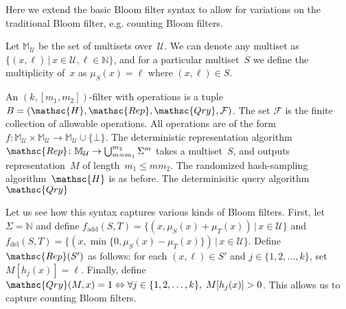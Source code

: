 Here we extend the basic Bloom filter syntax to allow for variations on the traditional Bloom filter, e.g. counting Bloom filters.  

Let $\mathbb{M}_\mathcal{U}$ be the set of multisets over~$\mathcal{U}$.  We can denote any multiset as $\{(x,\ell) \,|\, x \in \mathcal{U}, \ell \in \mathbb{N}\}$, and for a particular multiset~$S$ we define the multiplicity of~$x$ as $\mu_S(x) = \ell$ where $(x,\ell)\in S$.

An $(k,[m_1,m_2])$-filter with operations is a tuple  $B=(\mathsc{H},\mathsc{Rep},\mathsc{Qry}, \mathcal{F})$.  
The set $\mathcal{F}$ is the finite collection of allowable operations.  All operations are of the form 
$f: \mathbb{M}_{\mathcal{U}} \times \mathbb{M}_{\mathcal{U}} \rightarrow \mathbb{M}_{\mathcal{U}} \cup \{\bot\}$.  
%
The deterministic representation algorithm $\mathsc{Rep}\colon \mathbb{M}_\mathcal{U} \rightarrow \bigcup_{m=m_1}^{m_2}\Sigma^m$ takes a multiset~$S$, and outputs representation~$M$ of length~$m_1 \leq m m_2$.   
%
The randomized hash-sampling algorithm~$\mathsc{H}$ is as before.
%
The determinisitic query algorithm $\mathsc{Qry}$ 


Let us see how this syntax captures various kinds of Bloom filters.  First, let $\Sigma = \mathbb{N}$ and define $f_{\mathrm{add}}(S,T)=\{(x,\mu_S(x)+\mu_T(x)) \,|\, x \in \mathcal{U}\}$ and $f_\mathrm{del}(S,T) = \{(x,\min\{0,\mu_S(x)-\mu_T(x)\}) \,|\, x \in \mathcal{U} \}$.  Define $\mathsc{Rep}(S')$ as follows: for each $(x,\ell)\in S'$ and $j\in\{1,2,\ldots,k\}$, set $M[h_j(x)]=\ell$.   Finally, define $\mathsc{Qry}(M,x) = 1 \Leftrightarrow \forall j \in \{1,2,\ldots,k\},\; M[h_j(x)] > 0$.  This allows us to capture counting Bloom filters. 

